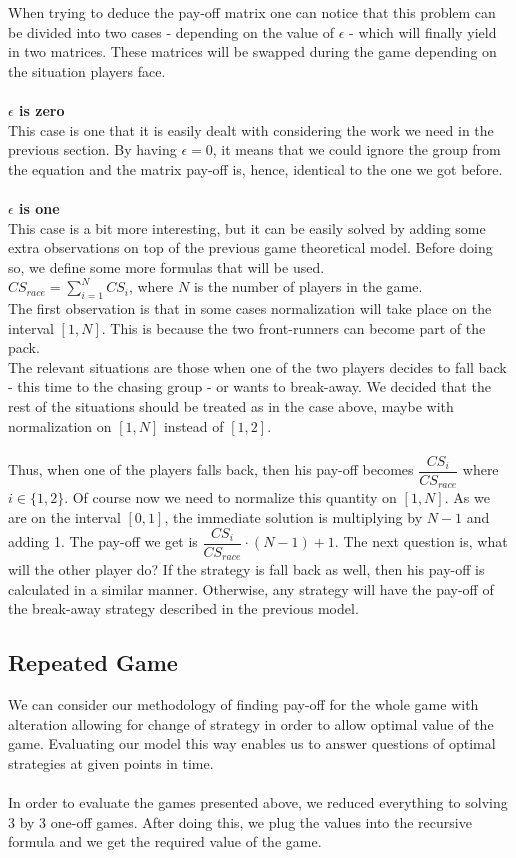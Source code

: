 \documentclass[10pt, a4paper]{report}
\begin{document}
When trying to deduce the pay-off matrix one can notice that this problem can be divided into two cases - depending on the value of $\epsilon$ - which will finally yield in two matrices. These matrices will be swapped during the game depending on the situation players face.
\\\\
\textbf{$\epsilon$ is zero}
\\
This case is one that it is easily dealt with considering the work we need in the previous section. By having $\epsilon = 0$, it means that we could ignore the group from the equation and the matrix pay-off is, hence, identical to the one we got before.
\\\\
\textbf{$\epsilon$ is one}
\\
This case is a bit more interesting, but it can be easily solved by adding some extra observations on top of the previous game theoretical model. Before doing so, we define some more formulas that will be used.\\
$CS_{race} = \sum\limits_{i=1}^{N} CS_i$, where $N$ is the number of players in the game. \\
The first observation is that in some cases normalization will take place on the interval $[1,N]$. This is because the two front-runners can become part of the pack.\\
The relevant situations are those when one of the two players decides to fall back - this time to the chasing group - or wants to break-away. We decided that the rest of the situations should be treated as in the case above, maybe with normalization on $[1,N]$ instead of $[1,2]$.\\\\
Thus, when one of the players falls back, then his pay-off becomes $\dfrac{CS_i}{CS_{race}}$ where $i\in\{1,2\}$. Of course now we need to normalize this quantity on $[1,N]$. As we are on the interval $[0,1]$, the immediate solution is multiplying by $N-1$ and adding 1. The pay-off we get is $ \dfrac{CS_i}{CS_{race}}\cdot (N-1) + 1$. The next question is, what will the other player do? If the strategy is fall back as well, then his pay-off is calculated in a similar manner. Otherwise, any strategy will have the pay-off of the break-away strategy described in the previous model.

\subsection{Repeated Game}
We can consider our methodology of finding pay-off for the whole game with alteration allowing for change of strategy in order to allow optimal value of the game. Evaluating our model this way enables us to answer questions of optimal strategies at given points in time.\\\\
In order to evaluate the games presented above, we reduced everything to solving 3 by 3 one-off games. After doing this, we plug the values into the recursive formula and we get the required value of the game.
\end{document}
